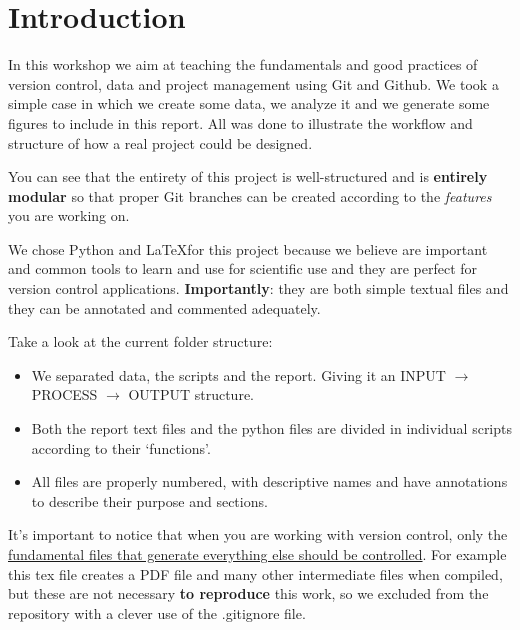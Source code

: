 \section{Introduction}

In this workshop we aim at teaching the fundamentals and good practices of version control, data and project management using Git and Github. We took a simple case in which we create some data, we analyze it and we generate some figures to include in this report. All was done to illustrate the workflow and structure of how a real project could be designed.

You can see that the entirety of this project is well-structured and is \textbf{entirely modular} so that proper Git branches can be created according to the \textit{features} you are working on.

We chose Python and \LaTeX for this project because we believe are important and common tools to learn and use for scientific use and they are perfect for version control applications. \textbf{Importantly}: they are both simple textual files and they can be annotated and commented adequately.

Take a look at the current folder structure:

\begin{itemize}
    \item We separated data, the scripts and the report. Giving it an INPUT $\rightarrow$ PROCESS $\rightarrow$ OUTPUT structure.
    \item Both the report text files and the python files are divided in individual scripts according to their `functions'.
    \item All files are properly numbered, with descriptive names and have annotations to describe their purpose and sections.
\end{itemize}

It's important to notice that when you are working with version control, only the \underline{fundamental files that generate everything else should be controlled}. For example this tex file creates a PDF file and many other intermediate files when compiled, but these are not necessary \textbf{to reproduce} this work, so we excluded from the repository with a clever use of the .gitignore file.
